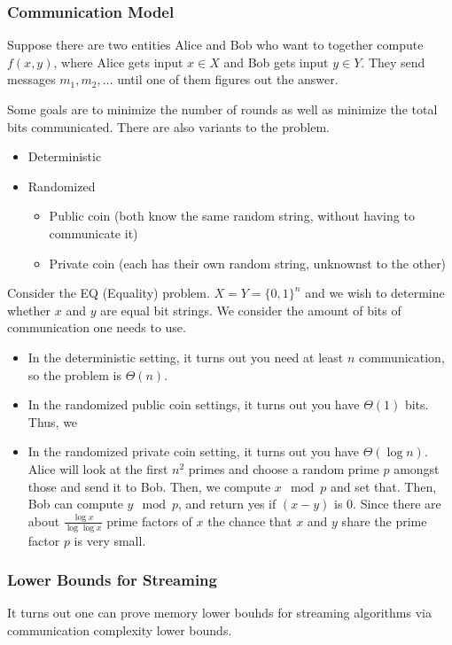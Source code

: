 \subsubsection{Communication Model}
Suppose there are two entities Alice and Bob who want to together compute $f(x, y)$, where Alice gets input $x \in X$ and Bob gets input $y \in Y$.
They send messages $m_1, m_2, \dots$ until one of them figures out the answer.

Some goals are to minimize the number of rounds as well as minimize the total bits communicated. There are also variants to the problem.

\begin{itemize}
    \item Deterministic
    \item Randomized
    \begin{itemize}
        \item Public coin (both know the same random string, without having to communicate it)
        \item Private coin (each has their own random string, unknownst to the other)
    \end{itemize}
\end{itemize}

\begin{example}
    Consider the EQ (Equality) problem. $X = Y = \{0, 1\}^n$ and we wish to determine whether $x$ and $y$ are equal bit strings. We consider the amount of bits of communication one needs to use.
    \begin{itemize}
        \item In the deterministic setting, it turns out you need at least $n$ communication, so the problem is $\Theta(n)$.
        \item In the randomized public coin settings, it turns out you have $\Theta(1)$ bits. Thus, we
        \item In the randomized private coin setting, it turns out you have $\Theta(\log n)$. Alice will look at the first $n^2$ primes and choose a random prime $p$ amongst those
        and send it to Bob. Then, we compute $x \mod p$ and set that. Then, Bob can compute $y \mod p$, and return yes if $(x - y)$ is 0. Since there are about $\frac{\log x}{\log \log x}$ prime factors of $x$
        the chance that $x$ and $y$ share the prime factor $p$ is very small. 
    \end{itemize}
\end{example}

\subsubsection{Lower Bounds for Streaming}
It turns out one can prove memory lower bouhds for streaming algorithms via communication complexity lower bounds.

